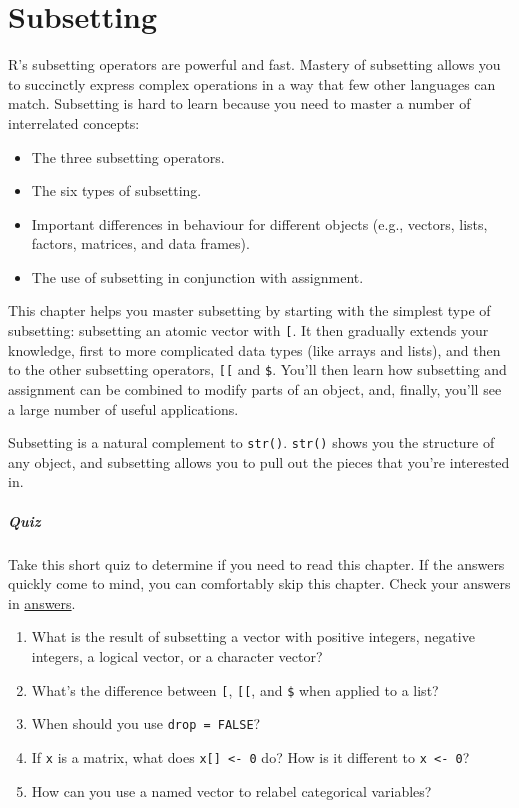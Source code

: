 \hypertarget{subsetting}{%
\chapter{Subsetting}\label{subsetting}}

R's subsetting operators are powerful and fast. Mastery of subsetting
allows you to succinctly express complex operations in a way that few
other languages can match. Subsetting is hard to learn because you need
to master a number of interrelated concepts:

\begin{itemize}
\item
  The three subsetting operators.
\item
  The six types of subsetting.
\item
  Important differences in behaviour for different objects (e.g.,
  vectors, lists, factors, matrices, and data frames).
\item
  The use of subsetting in conjunction with assignment.
\end{itemize}

This chapter helps you master subsetting by starting with the simplest
type of subsetting: subsetting an atomic vector with \texttt{{[}}. It
then gradually extends your knowledge, first to more complicated data
types (like arrays and lists), and then to the other subsetting
operators, \texttt{{[}{[}} and \texttt{\$}. You'll then learn how
subsetting and assignment can be combined to modify parts of an object,
and, finally, you'll see a large number of useful applications.

Subsetting is a natural complement to \texttt{str()}. \texttt{str()}
shows you the structure of any object, and subsetting allows you to pull
out the pieces that you're interested in. 

\hypertarget{quiz}{%
\paragraph{Quiz}\label{quiz}}

Take this short quiz to determine if you need to read this chapter. If
the answers quickly come to mind, you can comfortably skip this chapter.
Check your answers in \protect\hyperlink{subsetting-answers}{answers}.

\begin{enumerate}
\def\labelenumi{\arabic{enumi}.}
\item
  What is the result of subsetting a vector with positive integers,
  negative integers, a logical vector, or a character vector?
\item
  What's the difference between \texttt{{[}}, \texttt{{[}{[}}, and
  \texttt{\$} when applied to a list?
\item
  When should you use \texttt{drop\ =\ FALSE}?
\item
  If \texttt{x} is a matrix, what does \texttt{x{[}{]}\ \textless{}-\ 0}
  do? How is it different to \texttt{x\ \textless{}-\ 0}?
\item
  How can you use a named vector to relabel categorical variables?
\end{enumerate}

